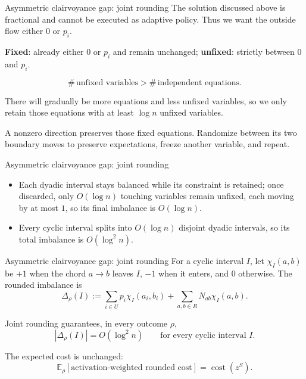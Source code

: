 \documentclass[aspectratio=169,12pt]{beamer}
\newcommand{\E}{\mathbb{E}}
\newcommand{\cost}{\operatorname{cost}}
\begin{document}
\begin{frame}{Asymmetric clairvoyance gap: joint rounding}
  \normalsize
  The solution discussed above is fractional and cannot be executed as adaptive policy.
  Thus we want the outside flow either $0$ or $p_i$.

  \medskip
  \textbf{Fixed}: already either $0$ or $p_i$ and remain unchanged;
  \textbf{unfixed}: strictly between $0$ and $p_i$.

  \smallskip
  \[
    \#\,\text{unfixed variables}
    >\#\,\text{independent equations}.
  \]

  There will gradually be more equations and less unfixed variables, so we only retain those 
  equations with at least $\log n$ unfixed variables.

  A nonzero direction preserves those fixed equations.
  Randomize between its two boundary moves to preserve expectations,
  freeze another variable, and repeat.
\end{frame}

\begin{frame}{Asymmetric clairvoyance gap: joint rounding}
  \centering
  \resizebox{0.70\linewidth}{!}{\ThDyadicRounding}

  \begin{itemize}\small\setlength{\itemsep}{0.85em}
    \item Each dyadic interval stays balanced while its constraint is retained;
      once discarded, only \(O(\log n)\) touching variables remain unfixed,
      each moving by at most \(1\), so its final imbalance is \(O(\log n)\).
    \item Every cyclic interval splits into \(O(\log n)\) disjoint dyadic
      intervals, so its total imbalance is \(O(\log^2 n)\).
  \end{itemize}
\end{frame}

\begin{frame}{Asymmetric clairvoyance gap: joint rounding}
  \small
  For a cyclic interval \(I\), let \(\chi_I(a,b)\) be \(+1\) when the chord
  \(a\to b\) leaves \(I\), \(-1\) when it enters, and \(0\) otherwise.
  The rounded imbalance is
  \[
    \Delta_\rho(I):=
    \sum_{i\in U}p_i\chi_I(a_i,b_i)
    +\sum_{a,b\in R}N_{ab}\chi_I(a,b).
  \]

  \smallskip
  Joint rounding guarantees, in every outcome \(\rho\),
  \[
    |\Delta_\rho(I)|=O(\log^2 n)
    \qquad\text{for every cyclic interval }I.
  \]

  \smallskip
  The expected cost is unchanged:
  \[
    \E_\rho[\text{activation-weighted rounded cost}]=\cost(z^S).
  \]
\end{frame}
\end{document}
